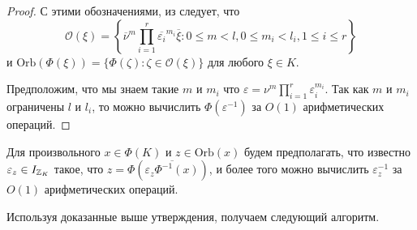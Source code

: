 \documentclass[_00_dissertation.tex]{subfiles}
\begin{document}
\begin{proof}
    С этими обозначениями, из \cite{source:Lezowski} следует, что
    \begin{equation}\label{equation:orbit}
        \mathcal{O}(\xi) = \left\{
            \overline{\nu}^m \prod\limits_{i=1}^r \overline{\varepsilon_i}^{m_i} \overline{\xi}:
                0 \le m < l, 0 \le m_i < l_i, 1 \le i \le r
        \right\}
    \end{equation}
    и $\textrm{Orb}(\Phi(\xi)) = \{\Phi(\zeta):\zeta \in \mathcal{O}(\xi)\}$ для любого $\xi\in K$.

    Предположим, что мы знаем такие $m$ и $m_i$ что $\varepsilon = \nu^m\prod_{i=1}^r \varepsilon_i^{m_i}$.
    Так как $m$ и $m_i$ ограничены $l$ и $l_i$, то можно вычислить $\Phi(\varepsilon^{-1})$ за $O(1)$ арифметических операций.
\end{proof}

\begin{remark}
    Для произвольного $x \in \Phi(K)$ и $z \in \textrm{Orb}(x)$ будем предполагать, что известно $\varepsilon_z \in I_{\mathbb{Z}_K}$ такое, что $z = \Phi(\overline{\varepsilon_z \Phi^{-1}(x)})$, и более того можно вычислить $\varepsilon_z^{-1}$ за $O(1)$ арифметических операций.
\end{remark}

Используя доказанные выше утверждения, получаем следующий алгоритм.
\end{document}
